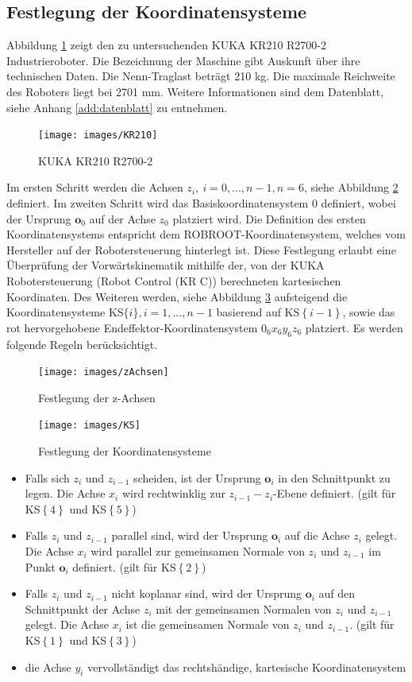 \subsection*{Festlegung der Koordinatensysteme}
Abbildung \ref{fig:kr210} zeigt den zu untersuchenden KUKA KR210 R2700-2 Industrieroboter. Die Bezeichnung der Maschine gibt Auskunft über ihre technischen Daten.  Die Nenn-Traglast beträgt 210 kg. Die maximale Reichweite des Roboters liegt bei 2701 mm. Weitere Informationen sind dem Datenblatt, siehe Anhang \ref{add:datenblatt} zu entnehmen.  
%
\begin{figure}[tbph]
	\centering
	\texttt{[image: images/KR210]}
	\caption{KUKA KR210 R2700-2}
	\label{fig:kr210}
\end{figure}
%
Im ersten Schritt werden die Achsen $z_i, \ i = 0,...,n-1, n=6$, siehe Abbildung \ref{fig:zachsen} definiert. Im zweiten Schritt wird das Basiskoordinatensystem ${0}$ definiert, wobei der Ursprung $\bm{o}_0$ auf der Achse $z_0$ platziert wird. Die Definition des ersten Koordinatensystems entspricht dem ROBROOT-Koordinatensystem, welches vom Hersteller auf der Robotersteuerung hinterlegt ist. Diese Festlegung erlaubt eine Überprüfung der Vorwärtskinematik mithilfe der, von der KUKA Robotersteuerung (Robot Control (KR C)) berechneten kartesischen Koordinaten. Des Weiteren werden, siehe Abbildung \ref{fig:KS} aufsteigend die Koordinatensysteme KS$\{i\},i=1,...,n-1$ basierend auf KS$\left\{i-1\right\}$, sowie das rot hervorgehobene Endeffektor-Koordinatensystem $0_6x_6y_6z_6$ platziert. Es werden folgende Regeln berücksichtigt.  
%
\begin{figure}[tbph]
	\centering
	\texttt{[image: images/zAchsen]}
	\caption[]{Festlegung der z-Achsen}
	\label{fig:zachsen}
\end{figure}
%
\begin{figure}[tbph]
	\centering
	\texttt{[image: images/KS]}
	\caption{Festlegung der Koordinatensysteme}
	\label{fig:KS}
\end{figure}
%
\begin{itemize}
	\item Falls sich $z_i$ und $z_{i-1}$ scheiden, ist der Ursprung $\bm{o}_i$ in den Schnittpunkt zu legen. Die Achse $x_i$ wird rechtwinklig zur $z_{i-1}-z_i$-Ebene definiert. (gilt für KS$\left\{4\right\}$ und KS$\left\{5\right\}$)
	\item Falls  $z_i$ und $z_{i-1}$ parallel sind, wird der Ursprung $\bm{o}_i$ auf die Achse $z_i$ gelegt. Die Achse $x_i$ wird parallel zur gemeinsamen Normale von $z_i$ und $z_{i-1}$	im Punkt $\bm{o}_i$ definiert. (gilt für KS$\left\{2\right\}$)
	\item Falls  $z_i$ und $z_{i-1}$ nicht koplanar sind, wird der Ursprung $\bm{o}_i$ auf den Schnittpunkt der Achse $z_i$ mit der gemeinsamen Normalen von $z_i$ und $z_{i-1}$  gelegt. Die Achse $x_i$ ist die gemeinsamen Normale von $z_i$ und $z_{i-1}$. (gilt für KS$\left\{1\right\}$ und KS$\left\{3\right\}$)
	\item die Achse $y_i$ vervollständigt das rechtshändige, kartesische Koordinatensystem
\end{itemize} 
